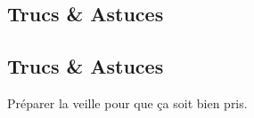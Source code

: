    \vspace{1cm}
    \hline
    \vspace{1cm}
    
    \subsection{Trucs \& Astuces}
        \subsection{Trucs \& Astuces}
	Préparer la veille pour que ça soit bien pris.
